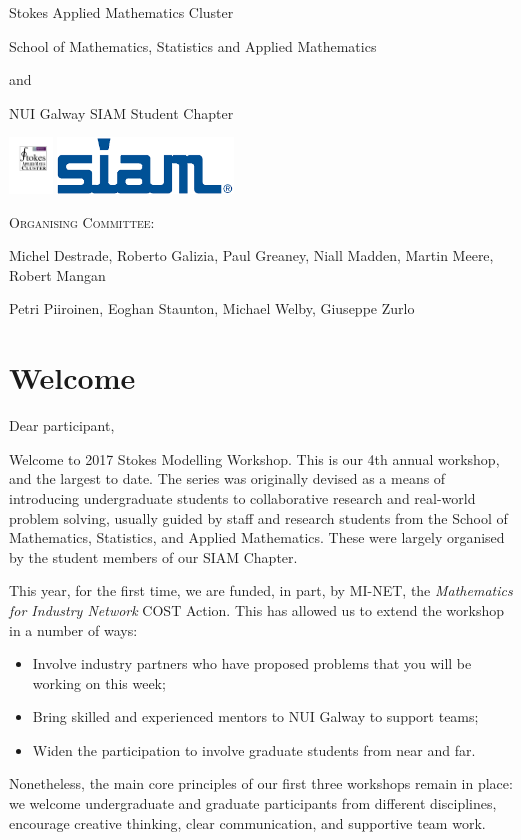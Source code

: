 \documentclass[a4paper, 11pt]{article}
\begin{document}
\vspace{60pt}
\centerline{\Large Stokes Applied Mathematics Cluster}
\centerline{\Large School of Mathematics, Statistics and Applied Mathematics}
\centerline{and}
\centerline{\Large NUI Galway SIAM Student Chapter}
\vspace{20pt}
\begin{center}
\includegraphics[height=1.5cm]{integral-stokes}
\hfill
\includegraphics[height=1.5cm]{SIAM}
\end{center}
\vspace{20pt}

\centerline{\textsc{Organising Committee:}}
\centerline{Michel Destrade, Roberto Galizia, Paul Greaney, Niall Madden, Martin Meere, Robert Mangan}
\centerline{Petri Piiroinen, Eoghan Staunton, Michael Welby, Giuseppe Zurlo}
\break

\pagestyle{plain}
\thispagestyle{plain}

\setcounter{page}{1}
\section*{Welcome}
Dear participant,

Welcome to 2017 Stokes Modelling Workshop. This is our 4th annual
workshop, and the largest to date. The series was originally devised
as a means of introducing undergraduate students to collaborative
research and real-world problem solving, usually guided by staff and
research students from the School of Mathematics, Statistics, and
Applied Mathematics. These were  largely organised by the student
members of our SIAM Chapter.

This year, for the first time, we are funded, in part, by 
MI-NET, the \emph{Mathematics for Industry    Network} COST Action.
This has allowed us to extend the workshop in a number of ways:
\begin{itemize}
\item Involve industry partners who have proposed problems that you
  will be working on this week;
\item Bring skilled and experienced mentors to NUI Galway to support
  teams;
\item Widen the participation to involve graduate students from near
  and far.
\end{itemize}
Nonetheless, the main core principles of our first three workshops
remain in place: we welcome undergraduate and graduate participants
from different disciplines,
encourage creative thinking, clear communication, and supportive team
work.
\end{document}

